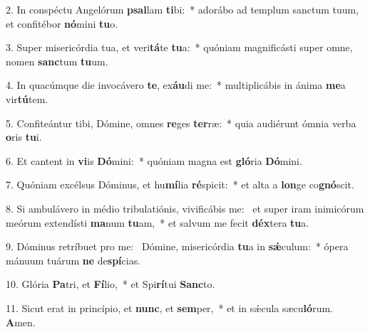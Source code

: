 2. In conspéctu Angelórum \textbf{psal}lam \textbf{ti}bi:~*  adorábo ad templum sanctum tuum, et confitébor \textbf{nó}mini \textbf{tu}o.\

3. Super misericórdia tua, et veri\textbf{tá}te \textbf{tu}a:~*  quóniam magnificásti super omne, nomen \textbf{sanc}tum \textbf{tu}um.\

4. In quacúmque die invocávero \textbf{te}, ex\textbf{áu}di me:~*  multiplicábis in ánima \textbf{me}a vir\textbf{tú}tem.\

5. Confiteántur tibi, Dómine, omnes \textbf{re}ges \textbf{ter}ræ:~*  quia audiérunt ómnia verba \textbf{o}ris \textbf{tu}i.\

6. Et cantent in \textbf{vi}is \textbf{Dó}mini:~*  quóniam magna est \textbf{gló}ria \textbf{Dó}mini.\

7. Quóniam excélsus Dóminus, et hu\textbf{mí}lia \textbf{ré}spicit:~*  et alta a \textbf{lon}ge co\textbf{gnó}scit.\

8. Si ambulávero in médio tribulatiónis, vivificábis me: \dag\  et super iram inimicórum meórum extendísti \textbf{ma}num \textbf{tu}am,~*  et salvum me fecit \textbf{déx}tera \textbf{tu}a.\

9. Dóminus retríbuet pro me: \dag\  Dómine, misericórdia \textbf{tu}a in \textbf{sǽ}culum:~*  ópera mánuum tuárum \textbf{ne} de\textbf{spí}cias.\

10. Glória \textbf{Pa}tri, et \textbf{Fí}lio,~*  et Spi\textbf{rí}tui \textbf{Sanc}to.\

11. Sicut erat in princípio, et \textbf{nunc}, et \textbf{sem}per,~*  et in sǽcula sæcu\textbf{ló}rum. \textbf{A}men.\

